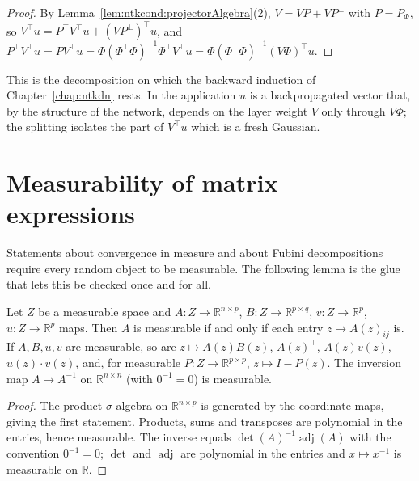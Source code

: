 \begin{proof}
  \leanok
By Lemma~\ref{lem:ntkcond:projectorAlgebra}(2), $V=VP+VP^\perp$ with $P=P_\Phi$, so $V^\top u=P^\top V^\top u+(VP^\perp)^\top u$, and $P^\top V^\top u=P V^\top u=\Phi(\Phi^\top\Phi)^{-1}\Phi^\top V^\top u=\Phi(\Phi^\top\Phi)^{-1}(V\Phi)^\top u$.
\end{proof}

This is the decomposition on which the backward induction of Chapter~\ref{chap:ntkdn} rests. In the application $u$ is a backpropagated vector that, by the structure of the network, depends on the layer weight $V$ only through $V\Phi$; the splitting isolates the part of $V^\top u$ which is a fresh Gaussian.


\section{Measurability of matrix expressions}\label{sec:ntkcond:measurability}

Statements about convergence in measure and about Fubini decompositions require every random object to be measurable. The following lemma is the glue that lets this be checked once and for all.

\begin{lemma}\label{lem:ntkcond:measurability}
  \leanok
Let $Z$ be a measurable space and $A:Z\to\mathbb R^{n\times p}$, $B:Z\to\mathbb R^{p\times q}$, $v:Z\to\mathbb R^p$, $u:Z\to\mathbb R^p$ maps. Then $A$ is measurable if and only if each entry $z\mapsto A(z)_{ij}$ is. If $A,B,u,v$ are measurable, so are $z\mapsto A(z)B(z)$, $A(z)^\top$, $A(z)v(z)$, $u(z)\cdot v(z)$, and, for measurable $P:Z\to\mathbb R^{p\times p}$, $z\mapsto I-P(z)$. The inversion map $A\mapsto A^{-1}$ on $\mathbb R^{n\times n}$ (with $0^{-1}=0$) is measurable.
\end{lemma}

\begin{proof}
  \leanok
The product $\sigma$-algebra on $\mathbb R^{n\times p}$ is generated by the coordinate maps, giving the first statement. Products, sums and transposes are polynomial in the entries, hence measurable. The inverse equals $\det(A)^{-1}\operatorname{adj}(A)$ with the convention $0^{-1}=0$; $\det$ and $\operatorname{adj}$ are polynomial in the entries and $x\mapsto x^{-1}$ is measurable on $\mathbb R$.
\end{proof}


